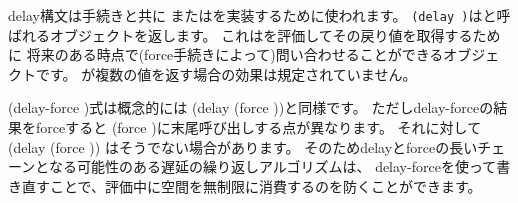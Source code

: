 \begin{entry}{%
}


\semantics
{\cf delay}構文は手続きと共に
またはを実装するために使われます。
{\tt(delay~)}はと呼ばれるオブジェクトを返します。
これはを評価してその戻り値を取得するために
将来のある時点で({\cf force}手続きによって)問い合わせることができるオブジェクトです。
が複数の値を返す場合の効果は規定されていません。

\end{entry}

\begin{entry}{%
}


\semantics
{\cf (delay-force )}式は概念的には
{\cf (delay (force ))}と同様です。
ただし{\cf delay-force}の結果をforceすると
{\cf (force )}に末尾呼び出しする点が異なります。
それに対して
{\cf (delay (force ))}
はそうでない場合があります。
そのため{\cf delay}と{\cf force}の長いチェーンとなる可能性のある遅延の繰り返しアルゴリズムは、
{\cf delay-force}を使って書き直すことで、評価中に空間を無制限に消費するのを防くことができます。

\end{entry}

